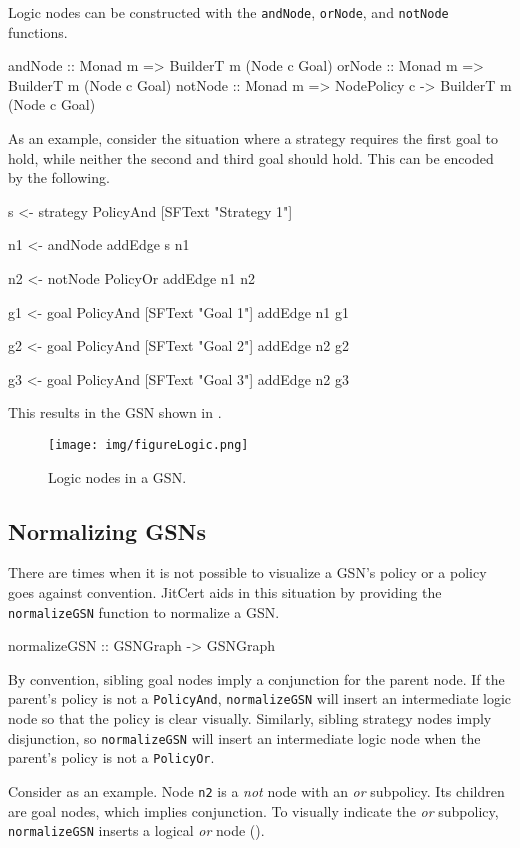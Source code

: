 \documentclass{article}
\newcommand{\jitcert}{JitCert\xspace}
\begin{document}
Logic nodes can be constructed with the \texttt{andNode}, \texttt{orNode}, and \texttt{notNode} functions.
\begin{code}
andNode :: Monad m => BuilderT m (Node c Goal)
orNode  :: Monad m => BuilderT m (Node c Goal)
notNode :: Monad m => NodePolicy c -> BuilderT m (Node c Goal)
\end{code}

As an example, consider the situation where a strategy requires the first goal to hold, while neither the second and third goal should hold. 
This can be encoded by the following.
\begin{mcode}
s <- strategy PolicyAnd [SFText "Strategy 1"]

n1 <- andNode
addEdge s n1

n2 <- notNode PolicyOr
addEdge n1 n2

g1 <- goal PolicyAnd [SFText "Goal 1"]
addEdge n1 g1

g2 <- goal PolicyAnd [SFText "Goal 2"]
addEdge n2 g2

g3 <- goal PolicyAnd [SFText "Goal 3"]
addEdge n2 g3
\end{mcode}
This results in the GSN shown in .

\begin{figure}
\centering
\texttt{[image: img/figureLogic.png]}
\caption{Logic nodes in a GSN.}
\label{fig:logic}
\end{figure}


\subsection{Normalizing GSNs}
\label{subsec:normalize}

There are times when it is not possible to visualize a GSN's policy or a policy goes against convention.
\jitcert aids in this situation by providing the \texttt{normalizeGSN} function to normalize a GSN. 
\begin{code}
normalizeGSN :: GSNGraph -> GSNGraph
\end{code}
By convention, sibling goal nodes imply a conjunction for the parent node. 
If the parent's policy is not a \texttt{PolicyAnd}, \texttt{normalizeGSN} will insert an intermediate logic node so that the policy is clear visually. 
Similarly, sibling strategy nodes imply disjunction, so \texttt{normalizeGSN} will insert an intermediate logic node when the parent's policy is not a \texttt{PolicyOr}. 

Consider  as an example. 
Node \texttt{n2} is a \emph{not} node with an \emph{or} subpolicy. 
Its children are goal nodes, which implies conjunction.
To visually indicate the \emph{or} subpolicy, \texttt{normalizeGSN} inserts a logical \emph{or} node ().
\end{document}

